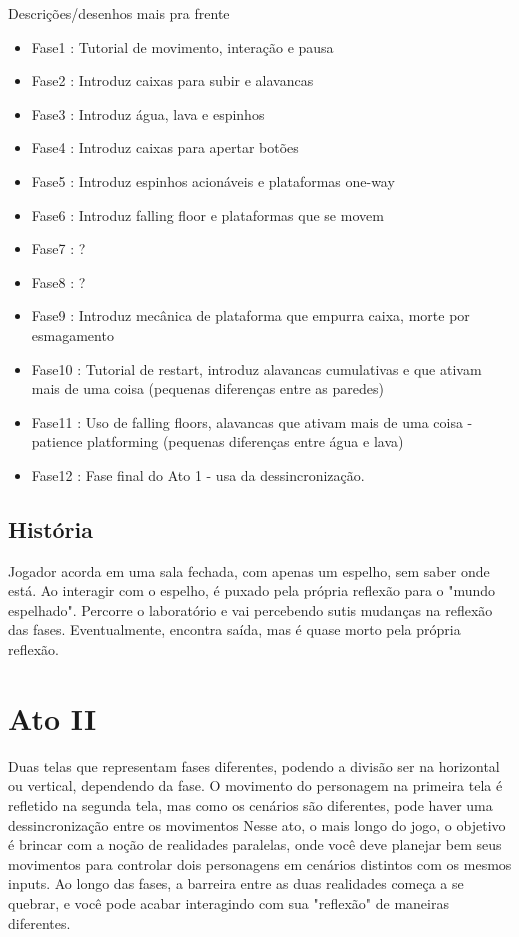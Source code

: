 \documentclass[a4paper, 11pt]{article}
\begin{document}
	Descrições/desenhos mais pra frente 
	\begin{itemize} 
		\item Fase1 : Tutorial de movimento, interação e pausa 
		\item Fase2 : Introduz caixas para subir e alavancas
		\item Fase3 : Introduz água, lava e espinhos
		\item Fase4 : Introduz caixas para apertar botões
		\item Fase5 : Introduz espinhos acionáveis e plataformas one-way
		\item Fase6 : Introduz falling floor e plataformas que se movem
		\item Fase7 : ?
		\item Fase8 : ?
		\item Fase9 : Introduz mecânica de plataforma que empurra caixa, morte por esmagamento
		\item Fase10 : Tutorial de restart, introduz alavancas cumulativas e que ativam mais de uma coisa (pequenas diferenças entre as paredes)
		\item Fase11 : Uso de falling floors, alavancas que ativam mais de uma coisa - patience platforming (pequenas diferenças entre água e lava)
		\item Fase12 : Fase final do Ato 1 - usa da dessincronização.
	\end{itemize} 
 
\subsection{História} 
 
	Jogador acorda em uma sala fechada, com apenas um espelho, sem saber onde está. Ao interagir com o espelho, é puxado pela própria reflexão para o "mundo espelhado".
	Percorre o laboratório e vai percebendo sutis mudanças na reflexão das fases. Eventualmente, encontra saída, mas é quase morto pela própria reflexão.

\section{Ato II} 
 
	Duas telas que representam fases diferentes, podendo a divisão ser na horizontal ou vertical, dependendo da fase. 
	O movimento do personagem na primeira tela é refletido na segunda tela, mas como os cenários são diferentes, pode 
	haver uma dessincronização entre os movimentos 
	Nesse ato, o mais longo do jogo, o objetivo é brincar com a noção de realidades paralelas, onde você deve planejar 
	bem seus movimentos para controlar dois personagens em cenários distintos com os mesmos inputs. Ao longo das fases, 
	a barreira entre as duas realidades começa a se quebrar, e você pode acabar interagindo com sua "reflexão" de  
	maneiras diferentes. 
 
\end{document}
